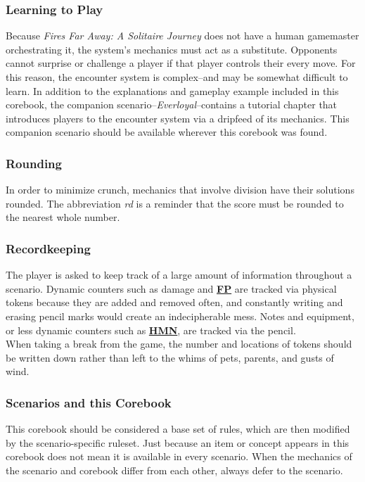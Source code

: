 \documentclass[12pt]{article}
\newcommand{\refto}[1]{\hyperlink{#1}{\textbf{#1}}}
\begin{document}
\begin{multicols*}{2}
\subsubsection*{Learning to Play}
Because \emph{Fires Far Away: A Solitaire Journey} does not have a human gamemaster orchestrating it, the system’s mechanics must act as a substitute. Opponents cannot surprise or challenge a player if that player controls their every move. For this reason, the encounter system is complex--and may be somewhat difficult to learn. In addition to the explanations and gameplay example included in this corebook, the companion scenario--\emph{Everloyal}--contains a tutorial chapter that introduces players to the encounter system via a dripfeed of its mechanics. This companion scenario should be available wherever this corebook was found.

\subsubsection*{Rounding}
In order to minimize crunch, mechanics that involve division have their solutions rounded. The abbreviation \emph{rd} is a reminder that the score must be rounded to the nearest whole number.

\subsubsection*{Recordkeeping}
The player is asked to keep track of a large amount of information throughout a scenario. Dynamic counters such as damage and \refto{FP} are tracked via physical tokens because they are added and removed often, and constantly writing and erasing pencil marks would create an indecipherable mess. Notes and equipment, or less dynamic counters such as \refto{HMN}, are tracked via the pencil.\\
When taking a break from the game, the number and locations of tokens should be written down rather than left to the whims of pets, parents, and gusts of wind.

\subsubsection*{Scenarios and this Corebook}
This corebook should be considered a base set of rules, which are then modified by the scenario-specific ruleset. Just because an item or concept appears in this corebook does not mean it is available in every scenario. When the mechanics of the scenario and corebook differ from each other, always defer to the scenario.


\end{multicols*}
\end{document}
